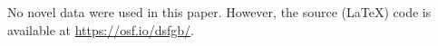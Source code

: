 \documentclass[utf8]{template/frontiersSCNS} %
\begin{document}
No novel data were used in this paper. However, the source (\LaTeX) code is available at \url{https://osf.io/dsfgb/}.






\end{document}
